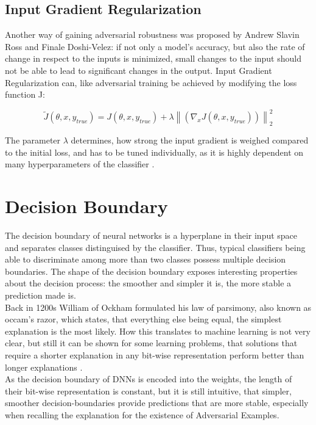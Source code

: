 \documentclass[draft,final]{vutinfth} %
\newcommand{\norm}[1]{\left\lVert#1\right\rVert}
\begin{document}
\subsection{Input Gradient Regularization}

Another way of gaining adversarial robustness was proposed by Andrew Slavin Ross and Finale Doshi-Velez: if not only a model's accuracy, but also the rate of change in respect to the inputs is minimized, small changes to the input should not be able to lead to significant changes in the output. 
Input Gradient Regularization can, like adversarial training be achieved by modifying the loss function J:

\begin{equation}
	\tilde{J}(\theta, x, y_{true}) = J(\theta, x, y_{true}) + \lambda \norm{(\nabla_x J(\theta, x, y_{true}))}_2^2
	\label{eq:gradreg}
\end{equation}

The parameter $\lambda$ determines, how strong the input gradient is weighed compared to the initial loss, and has to be tuned individually, as it is highly dependent on many hyperparameters of the classifier \cite{Ross2017}.

\section{Decision Boundary}

The decision boundary of neural networks is a hyperplane in their input space and separates classes distinguised by the classifier.
Thus, typical classifiers being able to discriminate among more than two classes possess multiple decision boundaries.
The shape of the decision boundary exposes interesting properties about the decision process: the smoother and simpler it is, the more stable a prediction made is.\\
Back in 1200s William of Ockham formulated his law of parsimony, also known as occam’s razor, which states, that everything else being equal, the simplest explanation is the most likely. 
How this translates to machine learning is not very clear, but still it can be shown for some learning problems, that solutions that require a shorter explanation in any bit-wise representation perform better than longer explanations \cite{Blumer1987}.\\
As the decision boundary of DNNs is encoded into the weights, the length of their bit-wise representation is constant, but it is still intuitive, that simpler, smoother decision-boundaries provide predictions that are more stable, especially when recalling the explanation for the existence of Adversarial Examples.
\end{document}
